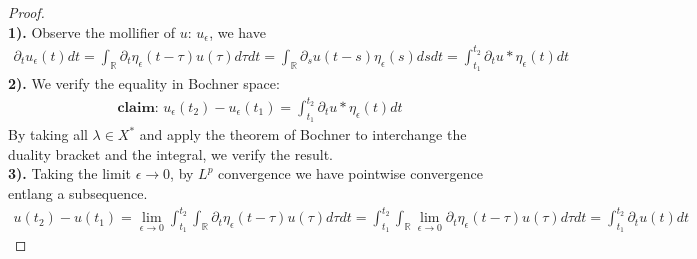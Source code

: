 \documentclass[a4paper,11pt,oneside,fleqn]{book}
\theoremstyle{definition}
\theoremstyle{remark}
\begin{document}
\begin{proof}\quad\\
	\textbf{1). }Observe the mollifier of $u$: $u_\epsilon$, we have
	\begin{align*}
		\partial_tu_\epsilon(t) dt 
	=  \int_{\mathbb{R}} \partial_t \eta_\epsilon (t - \tau) u(\tau) d\tau dt 
	= \int_{\mathbb{R}} \partial_s u (t -s) \eta_\epsilon (s)ds dt  = \int_{t_1}^{t_2} \partial_t u * \eta_\epsilon (t) dt 
	\end{align*}
	\textbf{2).}
	We verify the equality in Bochner space:
	\begin{align*}
	\textbf{claim: }  u_\epsilon(t_2) - u_\epsilon(t_1) = \int_{t_1}^{t_2} \partial_t u * \eta_\epsilon (t) dt
	\end{align*}
	By taking all $\lambda \in X^*$ and apply the theorem of Bochner to interchange the duality bracket and the integral, we verify the result.\\
	\textbf{3). }Taking the limit $\epsilon \rightarrow 0$, by $L^p$ convergence we have pointwise convergence entlang a subsequence.
	\begin{align*}
		u(t_2) - u(t_1) = \lim_{\epsilon \rightarrow 0} \int_{t_1}^{t_2}\int_{\mathbb{R}} \partial_t \eta_\epsilon (t - \tau) u(\tau) d\tau dt = \int_{t_1}^{t_2}\int_{\mathbb{R}} \lim_{\epsilon \rightarrow 0} \partial_t \eta_\epsilon (t - \tau) u(\tau) d\tau dt = \int_{t_1}^{t_2} \partial_t u(t)dt
	\end{align*}
\end{proof}
\end{document}
